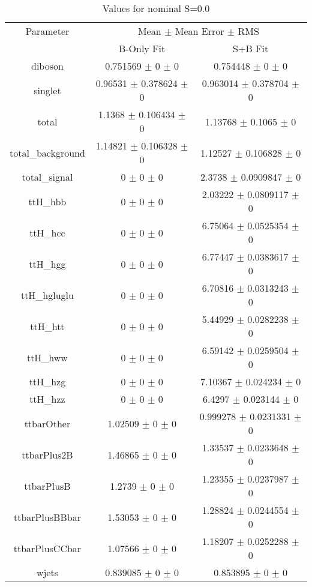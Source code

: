 \begin{table}
\centering
\caption{Values for nominal S=0.0}
\begin{tabular}{ccc}
\toprule
Parameter & \multicolumn{2}{c}{Mean $\pm$ Mean Error $\pm$ RMS}\\
 & B-Only Fit & S+B Fit\\
\midrule
diboson & \num{0.751569} $\pm$ \num{0} $\pm$ \num{0} & \num{0.754448} $\pm$ \num{0} $\pm$ \num{0}\\
singlet & \num{0.96531} $\pm$ \num{0.378624} $\pm$ \num{0} & \num{0.963014} $\pm$ \num{0.378704} $\pm$ \num{0}\\
total & \num{1.1368} $\pm$ \num{0.106434} $\pm$ \num{0} & \num{1.13768} $\pm$ \num{0.1065} $\pm$ \num{0}\\
total\_background & \num{1.14821} $\pm$ \num{0.106328} $\pm$ \num{0} & \num{1.12527} $\pm$ \num{0.106828} $\pm$ \num{0}\\
total\_signal & \num{0} $\pm$ \num{0} $\pm$ \num{0} & \num{2.3738} $\pm$ \num{0.0909847} $\pm$ \num{0}\\
ttH\_hbb & \num{0} $\pm$ \num{0} $\pm$ \num{0} & \num{2.03222} $\pm$ \num{0.0809117} $\pm$ \num{0}\\
ttH\_hcc & \num{0} $\pm$ \num{0} $\pm$ \num{0} & \num{6.75064} $\pm$ \num{0.0525354} $\pm$ \num{0}\\
ttH\_hgg & \num{0} $\pm$ \num{0} $\pm$ \num{0} & \num{6.77447} $\pm$ \num{0.0383617} $\pm$ \num{0}\\
ttH\_hgluglu & \num{0} $\pm$ \num{0} $\pm$ \num{0} & \num{6.70816} $\pm$ \num{0.0313243} $\pm$ \num{0}\\
ttH\_htt & \num{0} $\pm$ \num{0} $\pm$ \num{0} & \num{5.44929} $\pm$ \num{0.0282238} $\pm$ \num{0}\\
ttH\_hww & \num{0} $\pm$ \num{0} $\pm$ \num{0} & \num{6.59142} $\pm$ \num{0.0259504} $\pm$ \num{0}\\
ttH\_hzg & \num{0} $\pm$ \num{0} $\pm$ \num{0} & \num{7.10367} $\pm$ \num{0.024234} $\pm$ \num{0}\\
ttH\_hzz & \num{0} $\pm$ \num{0} $\pm$ \num{0} & \num{6.4297} $\pm$ \num{0.023144} $\pm$ \num{0}\\
ttbarOther & \num{1.02509} $\pm$ \num{0} $\pm$ \num{0} & \num{0.999278} $\pm$ \num{0.0231331} $\pm$ \num{0}\\
ttbarPlus2B & \num{1.46865} $\pm$ \num{0} $\pm$ \num{0} & \num{1.33537} $\pm$ \num{0.0233648} $\pm$ \num{0}\\
ttbarPlusB & \num{1.2739} $\pm$ \num{0} $\pm$ \num{0} & \num{1.23355} $\pm$ \num{0.0237987} $\pm$ \num{0}\\
ttbarPlusBBbar & \num{1.53053} $\pm$ \num{0} $\pm$ \num{0} & \num{1.28824} $\pm$ \num{0.0244554} $\pm$ \num{0}\\
ttbarPlusCCbar & \num{1.07566} $\pm$ \num{0} $\pm$ \num{0} & \num{1.18207} $\pm$ \num{0.0252288} $\pm$ \num{0}\\
wjets & \num{0.839085} $\pm$ \num{0} $\pm$ \num{0} & \num{0.853895} $\pm$ \num{0} $\pm$ \num{0}\\
\bottomrule
\end{tabular}
\end{table}